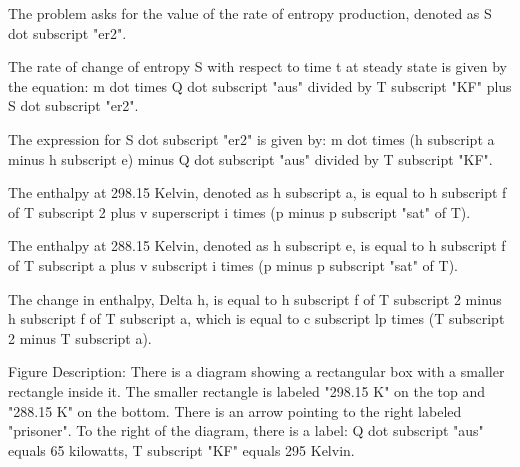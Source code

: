 The problem asks for the value of the rate of entropy production, denoted as S dot subscript "er2".

The rate of change of entropy S with respect to time t at steady state is given by the equation:
m dot times Q dot subscript "aus" divided by T subscript "KF" plus S dot subscript "er2".

The expression for S dot subscript "er2" is given by:
m dot times (h subscript a minus h subscript e) minus Q dot subscript "aus" divided by T subscript "KF".

The enthalpy at 298.15 Kelvin, denoted as h subscript a, is equal to h subscript f of T subscript 2 plus v superscript i times (p minus p subscript "sat" of T).

The enthalpy at 288.15 Kelvin, denoted as h subscript e, is equal to h subscript f of T subscript a plus v subscript i times (p minus p subscript "sat" of T).

The change in enthalpy, Delta h, is equal to h subscript f of T subscript 2 minus h subscript f of T subscript a, which is equal to c subscript lp times (T subscript 2 minus T subscript a).

Figure Description:
There is a diagram showing a rectangular box with a smaller rectangle inside it. The smaller rectangle is labeled "298.15 K" on the top and "288.15 K" on the bottom. There is an arrow pointing to the right labeled "prisoner". To the right of the diagram, there is a label:
Q dot subscript "aus" equals 65 kilowatts,
T subscript "KF" equals 295 Kelvin.